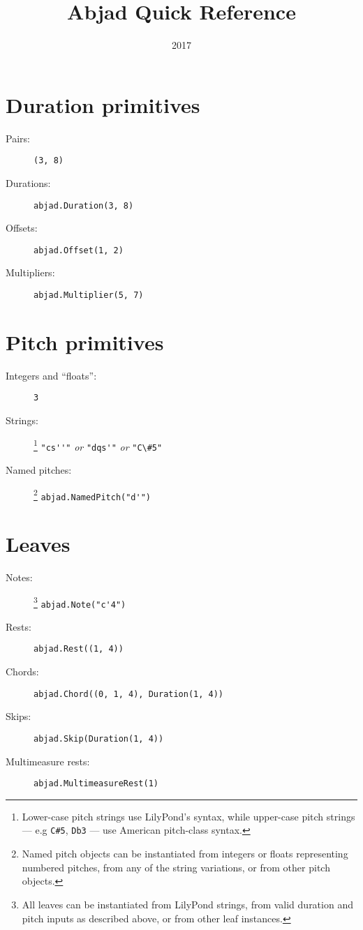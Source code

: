\documentclass[a4paper]{tufte-handout}
\title{Abjad Quick Reference}
\date{2017}
\begin{document}
\maketitle

\section{Duration primitives}

\begin{description}
    \item[Pairs:]
        \hfill \verb|(3, 8)|
    \item[Durations:]
        \hfill \verb|abjad.Duration(3, 8)|
    \item[Offsets:]
        \hfill \verb|abjad.Offset(1, 2)|
    \item[Multipliers:]
        \hfill \verb|abjad.Multiplier(5, 7)|
\end{description}

\section{Pitch primitives}

\begin{description}
    \item[Integers and \enquote{floats}:]
        \hfill \verb|3|
    \item[Strings:]\footnote{%
        Lower-case pitch strings use LilyPond's syntax, while upper-case pitch
        strings --- e.g \texttt{C\#5}, \texttt{Db3} --- use American pitch-class
        syntax.}
        \hfill \verb|"cs''"| \emph{or} \verb|"dqs'"| \emph{or} \verb|"C\#5"|
    \item[Named pitches:]\footnote{%
        Named pitch objects can be instantiated from integers or floats
        representing numbered pitches, from any of the string variations, or
        from other pitch objects.}
        \hfill \verb|abjad.NamedPitch("d'")|
\end{description}

\section{Leaves}

\begin{description}
    \item[Notes:]\footnote{%
        All leaves can be instantiated from LilyPond strings,
        from valid duration and pitch inputs as described above, or from other
        leaf instances.}
        \hfill \verb|abjad.Note("c'4")|
    \item[Rests:]
        \hfill \verb|abjad.Rest((1, 4))|
    \item[Chords:]
        \hfill \verb|abjad.Chord((0, 1, 4), Duration(1, 4))|
    \item[Skips:]
        \hfill \verb|abjad.Skip(Duration(1, 4))|
    \item[Multimeasure rests:]
        \hfill \verb|abjad.MultimeasureRest(1)|
\end{description}
\end{document}
